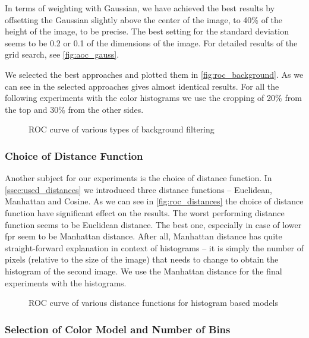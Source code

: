 In terms of weighting with Gaussian, we have achieved the best results
by offsetting the Gaussian slightly above the center of the image, to 40\%
of the height of the image, to be precise. The best setting for the standard deviation seems to be 0.2 or 0.1 of the dimensions of the image. For detailed results
of the grid search, see \autoref{fig:aoc_gauss}.

We selected the best approaches and plotted them in \autoref{fig:roc_background}. As we can see in the selected approaches gives almost identical results. For all the following experiments with the color histograms we use the cropping of 20\% from the top and 30\% from the other sides.

\begin{figure}
    \centering
    \def\svgwidth{\columnwidth}
    
    \caption{ROC curve of various types of background filtering}
    \label{fig:roc_background}
\end{figure}

\subsubsection{Choice of Distance Function}

Another subject for our experiments is the choice of distance function. In
\autoref{ssec:used_distances} we introduced three distance functions --
Euclidean, Manhattan and Cosine. As we can see in \autoref{fig:roc_distances}
the choice of distance function have significant effect on the results.
The worst performing distance function seems to be Euclidean distance. The best one,
especially in case of lower \gls{fpr} seem to be Manhattan distance.
After all, Manhattan distance has quite straight-forward explanation in context
of histograms -- it is simply the number of pixels (relative to the size of the image) that needs to change to obtain the histogram of the second image. We use the Manhattan distance for the final experiments with the histograms.

\begin{figure}
    \centering
    \def\svgwidth{\columnwidth}
    
    \caption{ROC curve of various distance functions for histogram based models}
    \label{fig:roc_distances}
\end{figure}

\subsubsection{Selection of Color Model and Number of Bins}

